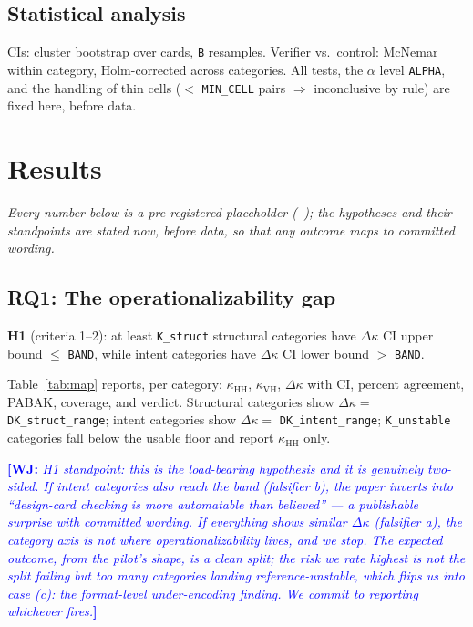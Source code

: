 \documentclass[conference]{IEEEtran}
\newcommand{\wj}[1]{\textcolor{blue}{\textbf{[WJ:} \textit{#1}\textbf{]}}}
\newcommand{\ph}[1]{\colorbox{yellow!35}{\texttt{\footnotesize #1}}}
\newcommand{\kh}{\kappa_{\mathrm{HH}}}
\newcommand{\kv}{\kappa_{\mathrm{VH}}}
\newcommand{\dk}{\Delta\kappa}
\begin{document}
\subsection{Statistical analysis}
CIs: cluster bootstrap over cards, \ph{B} resamples. Verifier vs.\ control:
McNemar within category, Holm-corrected across categories. All tests, the
$\alpha$ level \ph{ALPHA}, and the handling of thin cells ($<$
\ph{MIN\_CELL} pairs $\Rightarrow$ inconclusive by rule) are fixed here, before
data.

\section{Results}\label{sec:results}

\noindent\emph{Every number below is a pre-registered placeholder (\ph{~}); the
hypotheses and their standpoints are stated now, before data, so that any
outcome maps to committed wording.}

\subsection{RQ1: The operationalizability gap}
\textbf{H1} (criteria 1--2): at least \ph{K\_struct} structural categories have
$\dk$ CI upper bound $\leq$ \ph{BAND}, while intent categories have $\dk$ CI
lower bound $>$ \ph{BAND}.

Table~\ref{tab:map} reports, per category: $\kh$, $\kv$, $\dk$ with CI, percent
agreement, PABAK, coverage, and verdict.
Structural categories show $\dk =$ \ph{DK\_struct\_range}; intent categories
show $\dk =$ \ph{DK\_intent\_range}; \ph{K\_unstable} categories fall below the
usable floor and report $\kh$ only.

\wj{H1 standpoint: this is the load-bearing hypothesis and it is genuinely
two-sided. If intent categories also reach the band (falsifier b), the paper
inverts into ``design-card checking is more automatable than believed'' --- a
publishable surprise with committed wording. If everything shows similar
$\dk$ (falsifier a), the category axis is not where operationalizability
lives, and we stop. The expected outcome, from the pilot's shape, is a clean
split; the risk we rate highest is not the split failing but too many
categories landing reference-unstable, which flips us into case (c):
the format-level under-encoding finding. We commit to reporting whichever
fires.}
\end{document}
